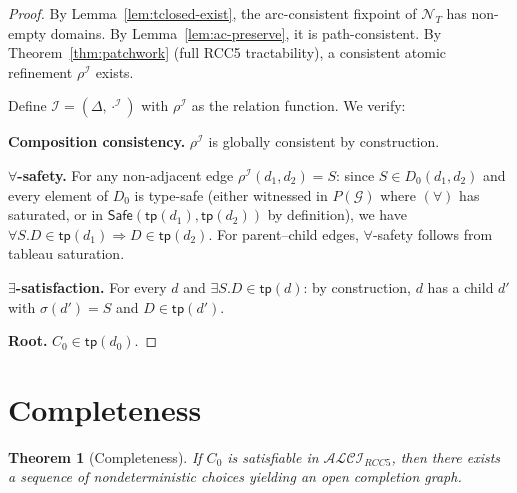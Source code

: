 \documentclass[a4paper,11pt]{article}
\newtheorem{theorem}{Theorem}[section]
\theoremstyle{definition}
\newcommand{\ALCIRCC}[1]{\ensuremath{\mathcal{ALCI}_{\mathit{RCC#1}}}}
\newcommand{\tp}{\ensuremath{\mathsf{tp}}}
\newcommand{\Safe}{\ensuremath{\mathsf{Safe}}}
\newcommand{\interp}{\ensuremath{\mathcal{I}}}
\newcommand{\GG}{\ensuremath{\mathcal{G}}}
\newcommand{\NN}{\ensuremath{\mathcal{N}}}
\begin{document}
\begin{proof}
By Lemma~\ref{lem:tclosed-exist}, the arc-consistent fixpoint
of $\NN_T$ has non-empty domains.  By
Lemma~\ref{lem:ac-preserve}, it is path-consistent.  By
Theorem~\ref{thm:patchwork} (full RCC5 tractability), a consistent
atomic refinement $\rho^{\interp}$ exists.

Define $\interp = (\Delta, \cdot^{\interp})$ with
$\rho^{\interp}$ as the relation function.  We verify:

\medskip\noindent\textbf{Composition consistency.}\;
$\rho^{\interp}$ is globally consistent by construction.

\medskip\noindent\textbf{$\forall$-safety.}\;
For any non-adjacent edge $\rho^{\interp}(d_1, d_2) = S$:
since $S \in D_0(d_1, d_2)$ and every element of $D_0$ is
type-safe (either witnessed in $P(\GG)$ where $(\forall)$
has saturated, or in $\Safe(\tp(d_1), \tp(d_2))$ by
definition), we have $\forall S.D \in \tp(d_1) \Rightarrow
D \in \tp(d_2)$.  For parent--child edges, $\forall$-safety
follows from tableau saturation.

\medskip\noindent\textbf{$\exists$-satisfaction.}\;
For every $d$ and $\exists S.D \in \tp(d)$: by construction,
$d$ has a child $d'$ with $\sigma(d') = S$ and
$D \in \tp(d')$.

\medskip\noindent\textbf{Root.}\; $C_0 \in \tp(d_0)$.
\end{proof}


\section{Completeness}\label{sec:completeness}

\begin{theorem}[Completeness]\label{thm:completeness}
If $C_0$ is satisfiable in $\ALCIRCC{5}$, then there exists a
sequence of nondeterministic choices yielding an open completion
graph.
\end{theorem}
\end{document}
